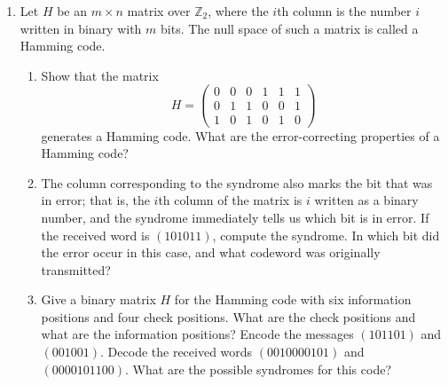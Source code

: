 {\begin{enumerate}
\begin{enumerate}
 \item
Find the dual code of the linear code $C$ where $C$ is given by the
matrix 
\[
\left(
\begin{array}{ccccc}
1 & 1 & 1 & 0 & 0 \\
0 & 0 & 1 & 0 & 1 \\
1 & 0 & 0 & 1 & 0
\end{array}
\right).
\]
 
 \item
Show that $C^\perp$ is an $(n, n-k)$-linear code.
 
 \item
Find the standard generator and parity-check matrices of $C$ and
$C^\perp$. What happens in general? Prove your conjecture. 
 
\end{enumerate}
 
 
\item
Let $H$ be an $m \times n$ matrix over ${\mathbb Z}_2$, where the $i$th
column is the number $i$ written in binary with $m$ bits. The null
space of such a matrix is called a {\bfi Hamming
code}. 
\begin{enumerate}
 
 \item
Show  that the matrix
\[
H =
\left(
\begin{array}{cccccc}
0 & 0 & 0 & 1 & 1 & 1 \\
0 & 1 & 1 & 0 & 0 & 1 \\
1 & 0 & 1 & 0 & 1 & 0
\end{array}
\right)
\]
generates a Hamming code. What are the error-correcting properties of
a Hamming code? 
 
 \item
The column corresponding to the syndrome also marks the bit that was
in error; that is, the $i$th column of the matrix is $i$ written as a
binary number, and the syndrome 
immediately tells us which bit is in error. If the received word is 
$(101011)$, compute the syndrome.  In
which bit did the error occur in this case, and what codeword was
originally transmitted?
 
 \item
Give a binary matrix $H$ for the Hamming code with six information
positions and four check positions. What are the check positions and
what are the information positions? Encode the messages $(101101)$ and
$(001001)$. Decode the received words $(0010000101)$ and
$(0000101100)$.  What are the possible syndromes for this code?
 

\end{enumerate}
\end{enumerate}}
